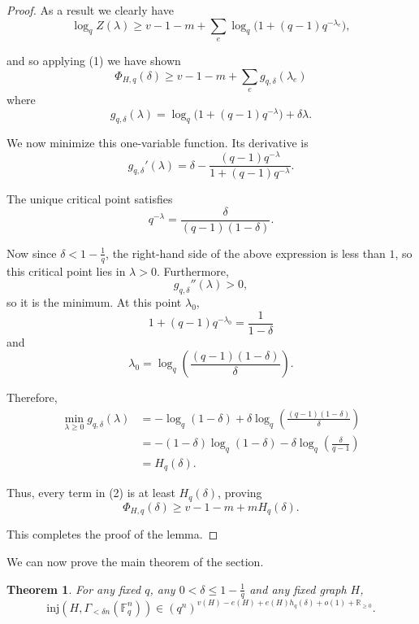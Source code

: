 \documentclass[12pt]{article}
\newtheorem{theorem}{Theorem}
\newcommand{\inj}{\mathrm{inj}}
\newcommand{\Fq}{\mathbb{F}_q}
\begin{document}
\begin{proof}
As a result we clearly have
\[
\log_q Z(\lambda)\geq v-1-m+\sum_e \log_q\bigl(1+(q-1)q^{-\lambda_e}\bigr),
\]

and so applying (1) we have shown
\[
\Phi_{H,q}(\delta)\geq v-1-m+\sum_e g_{q,\delta}(\lambda_e)\tag{2}
\]
where
\[
g_{q,\delta}(\lambda)=\log_q\bigl(1+(q-1)q^{-\lambda}\bigr)+\delta\lambda.
\]




We now minimize this one-variable function. Its derivative is
\[
g_{q,\delta}'(\lambda)=\delta-\frac{(q-1)q^{-\lambda}}{1+(q-1)q^{-\lambda}}.
\]

The unique critical point satisfies
\[
q^{-\lambda}=\frac{\delta}{(q-1)(1-\delta)}.
\]

Now since $\delta<1-\frac1q$, the right-hand side of the above expression is less than $1$, so this critical point lies in
$\lambda>0$. Furthermore,
\[
g_{q,\delta}''(\lambda)>0,
\]
so it is the minimum. At this point $\lambda_0$,
\[
1+(q-1)q^{-\lambda_0}=\frac1{1-\delta}
\]
and
\[
\lambda_0=\log_q\left(\frac{(q-1)(1-\delta)}{\delta}\right).
\]

\noindent Therefore, 
\begin{align*}
\min_{\lambda\geq0}g_{q,\delta}(\lambda)
&=-\log_q(1-\delta)+\delta\log_q\left(\frac{(q-1)(1-\delta)}{\delta}\right)\\
&=-(1-\delta)\log_q(1-\delta)-\delta\log_q\left(\frac{\delta}{q-1}\right)\\
&=H_q(\delta).
\end{align*}

\noindent Thus, every term in (2) is at least $H_q(\delta)$, proving
\[
\Phi_{H,q}(\delta)\geq v-1-m+mH_q(\delta).
\]

\noindent This completes the proof of the lemma.
\end{proof}

We can now prove the main theorem of the section.

\begin{theorem}
\label{thm: Hamming-H-Count}
For any fixed $q$, any $0<\delta\leq1-\frac{1}{q}$ and any fixed graph $H$,
\[
\inj\left(H,\Gamma_{<\delta n}(\Fq^n)\right)\in (q^n)^{v(H)-e(H)+e(H)h_q(\delta)+o(1)+\mathbb R_{\geq0}}.
\]
\end{theorem}
\end{document}
